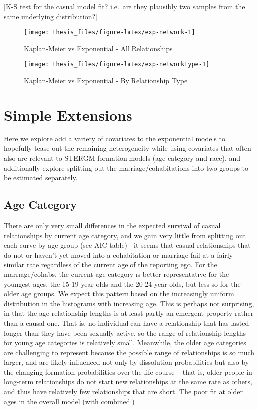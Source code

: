 \documentclass [11pt, proquest] {uwthesis}[2015/03/03]
\begin{document}
{[}K-S test for the casual model fit? i.e.~are they plausibly two
samples from the same underlying distribution?{]}
\begin{figure}
\texttt{[image: thesis\_files/figure-latex/exp-network-1]} \caption{Kaplan-Meier vs Exponential - All Relationships}\label{fig:exp-network}
\end{figure}
\begin{figure}
\texttt{[image: thesis\_files/figure-latex/exp-networktype-1]} \caption{Kaplan-Meier vs Exponential - By Relationship Type}\label{fig:exp-networktype}
\end{figure}
\section{Simple Extensions}\label{simple-extensions}

Here we explore add a variety of covariates to the exponential models to
hopefully tease out the remaining heterogeneity while using covariates
that often also are relevant to STERGM formation models (age category
and race), and additionally explore splitting out the
marriage/cohabitations into two groups to be estimated separately.

\subsection{Age Category}\label{age-category}

There are only very small differences in the expected survival of casual
relationships by current age category, and we gain very little from
splitting out each curve by age group (see AIC table) - it seems that
casual relationships that do not or haven't yet moved into a
cohabitation or marriage fail at a fairly similar rate regardless of the
current age of the reporting ego. For the marriage/cohabs, the current
age category is better representative for the youngest ages, the 15-19
year olds and the 20-24 year olds, but less so for the older age groups.
We expect this pattern based on the increasingly uniform distribution in
the histograms with increasing age. This is perhaps not surprising, in
that the age relationship lengths is at least partly an emergent
property rather than a causal one. That is, no individual can have a
relationship that has lasted longer than they have been sexually active,
so the range of relationship lengths for young age categories is
relatively small. Meanwhile, the older age categories are challenging to
represent because the possible range of relationships is so much larger,
and are likely influenced not only by dissolution probabilities but also
by the changing formation probabilities over the life-course -- that is,
older people in long-term relationships do not start new relationships
at the same rate as others, and thus have relatively few relationships
that are short. The poor fit at older ages in the overall model (with
combined )
\end{document}

